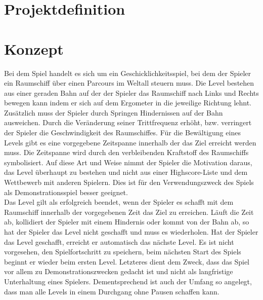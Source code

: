 

\chapter{Projektdefinition}


\chapter{Konzept}
Bei dem Spiel handelt es sich um ein Geschicklichkeitsspiel, bei dem der Spieler ein Raumschiff über einen Parcours im Weltall steuern muss. Die Level bestehen aus einer geraden Bahn auf der der Spieler das Raumschiff nach Links und Rechts bewegen kann indem er sich auf dem Ergometer in die jeweilige Richtung lehnt. Zusätzlich muss der Spieler durch Springen Hindernissen auf der Bahn ausweichen. Durch die Veränderung seiner Trittfrequenz erhöht, bzw. verringert der Spieler die Geschwindigkeit des Raumschiffes. Für die Bewältigung eines Levels gibt es eine vorgegebene Zeitspanne innerhalb der das Ziel erreicht werden muss. Die Zeitspanne wird durch den verbleibenden Kraftstoff des Raumschiffs symbolisiert. Auf diese Art und Weise nimmt der Spieler die Motivation daraus, das Level überhaupt zu bestehen und nicht aus einer Highscore-Liste und dem Wettbewerb mit anderen Spielern. Dies ist für den Verwendungszweck des Spiels als Demonstrationsspiel besser geeignet.\\
Das Level gilt als erfolgreich beendet, wenn der Spieler es schafft mit dem Raumschiff innerhalb der vorgegebenen Zeit das Ziel zu erreichen. Läuft die Zeit ab, kollidiert der Spieler mit einem Hindernis oder kommt von der Bahn ab, so hat der Spieler das Level nicht geschafft und muss es wiederholen. Hat der Spieler das Level geschafft, erreicht er automatisch das nächste Level. Es ist nicht vorgesehen, den Spielfortschritt zu speichern, beim nächsten Start des Spiels beginnt er wieder beim ersten Level. Letzteres dient dem Zweck, dass das Spiel vor allem zu Demonstrationszwecken gedacht ist und nicht als langfristige Unterhaltung eines Spielers. Dementsprechend ist auch der Umfang so angelegt, dass man alle Levels in einem Durchgang ohne Pausen schaffen kann.
